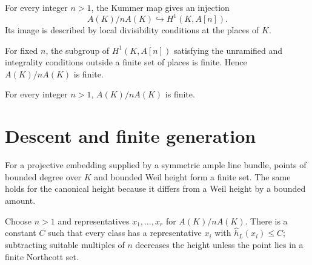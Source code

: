 \begin{proposition}
\label{mumford-prop-kummer-injection}
For every integer $n>1$, the Kummer map gives an injection
\[
 A(K)/nA(K)\hookrightarrow H^1(K,A[n]).
\]
Its image is described by local divisibility conditions at the places of $K$.
\notready
\end{proposition}

\begin{lemma}
\label{mumford-lem-finite-kummer-quotient}
For fixed $n$, the subgroup of $H^1(K,A[n])$ satisfying the unramified and
integrality conditions outside a finite set of places is finite.  Hence
$A(K)/nA(K)$ is finite.
\notready
\end{lemma}

\begin{theorem}
\label{mumford-thm-weak-mordell-weil}
For every integer $n>1$, $A(K)/nA(K)$ is finite.
\notready
\end{theorem}

\section{Descent and finite generation}
\label{mumford-AppII-descent}

\begin{lemma}
\label{mumford-lem-northcott-abelian}
For a projective embedding supplied by a symmetric ample line bundle, points
of bounded degree over $K$ and bounded Weil height form a finite set.  The same
holds for the canonical height because it differs from a Weil height by a
bounded amount.
\notready
\end{lemma}

\begin{proposition}
\label{mumford-prop-finite-descent-set}
Choose $n>1$ and representatives $x_1,\ldots,x_r$ for $A(K)/nA(K)$.  There is a
constant $C$ such that every class has a representative $x_i$ with
$\hat h_L(x_i)\le C$; subtracting suitable multiples of $n$ decreases the
height unless the point lies in a finite Northcott set.
\notready
\end{proposition}

